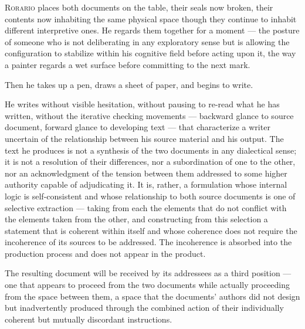 \documentclass[12pt, oneside]{article}
\newenvironment{action}{%
  \vspace{0.6em}%
  \noindent\ignorespaces%
}{%
  \par\vspace{0.6em}%
}
\begin{document}
\begin{action}
\textsc{Rorario} places both documents on the table, their seals now broken, their contents now inhabiting the same physical space though they continue to inhabit different interpretive ones. He regards them together for a moment --- the posture of someone who is not deliberating in any exploratory sense but is allowing the configuration to stabilize within his cognitive field before acting upon it, the way a painter regards a wet surface before committing to the next mark.

Then he takes up a pen, draws a sheet of paper, and begins to write.

He writes without visible hesitation, without pausing to re-read what he has written, without the iterative checking movements --- backward glance to source document, forward glance to developing text --- that characterize a writer uncertain of the relationship between his source material and his output. The text he produces is not a synthesis of the two documents in any dialectical sense; it is not a resolution of their differences, nor a subordination of one to the other, nor an acknowledgment of the tension between them addressed to some higher authority capable of adjudicating it. It is, rather, a formulation whose internal logic is self-consistent and whose relationship to both source documents is one of selective extraction --- taking from each the elements that do not conflict with the elements taken from the other, and constructing from this selection a statement that is coherent within itself and whose coherence does not require the incoherence of its sources to be addressed. The incoherence is absorbed into the production process and does not appear in the product.

The resulting document will be received by its addressees as a third position --- one that appears to proceed from the two documents while actually proceeding from the space between them, a space that the documents' authors did not design but inadvertently produced through the combined action of their individually coherent but mutually discordant instructions.
\end{action}
\end{document}
